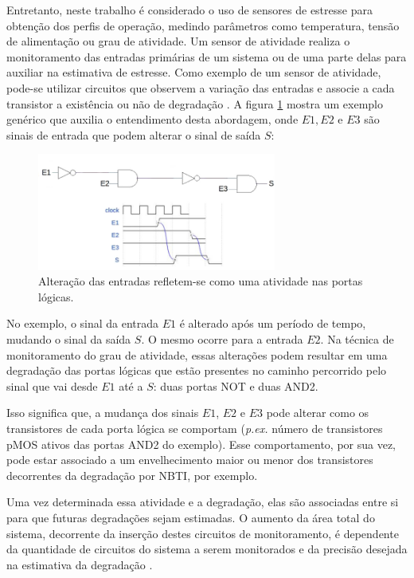 Entretanto, neste trabalho é considerado o uso de sensores de estresse para obtenção dos perfis de operação, medindo parâmetros como temperatura, tensão de alimentação ou grau de atividade. Um sensor de atividade realiza o monitoramento das entradas primárias de um sistema ou de uma parte delas para auxiliar na estimativa de estresse. Como exemplo de um sensor de atividade, pode-se utilizar circuitos que observem a variação das entradas e associe a cada transistor a existência ou não de degradação \cite{Baranowski2015}. A figura \ref{figure:monitor_atividades} mostra um exemplo genérico que auxilia o entendimento desta abordagem, onde $E1, E2$ e $E3$ são sinais de entrada que podem alterar o sinal de saída $S$:
\begin{figure}[H]
	\center
	\includegraphics[width=0.7\textwidth]{images/monitor_atividades}
	\caption{Alteração das entradas refletem-se como uma atividade nas portas lógicas.}
		\label{figure:monitor_atividades}
\end{figure}

No exemplo, o sinal da entrada $E1$ é alterado após um período de tempo, mudando o sinal da saída $S$. O mesmo ocorre para a entrada $E2$. Na técnica de monitoramento do grau de atividade, essas alterações podem resultar em uma degradação das portas lógicas que estão presentes no caminho percorrido pelo sinal que vai desde $E1$ até a $S$: duas portas NOT e duas AND2.

Isso significa que, a mudança dos sinais $E1$, $E2$ e $E3$ pode alterar como os transistores de cada porta lógica se comportam (\textit{p.ex.} número de transistores pMOS ativos das portas AND2 do exemplo). Esse comportamento, por sua vez, pode estar associado a um envelhecimento maior ou menor dos transistores decorrentes da degradação por NBTI, por exemplo.

Uma vez determinada essa atividade e a degradação, elas são associadas entre si para que futuras degradações sejam estimadas. O aumento da área total do sistema, decorrente da inserção destes circuitos de monitoramento, é dependente da quantidade de circuitos do sistema a serem monitorados e da precisão desejada na estimativa da degradação \cite{Baranowski2015}.

